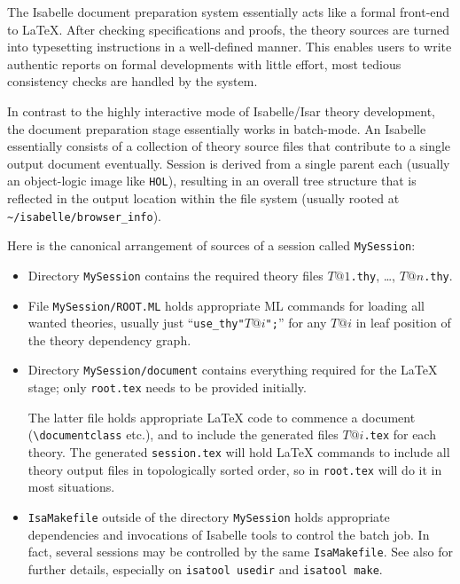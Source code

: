 \begin{isabellebody}
\begin{isamarkuptext}
  \medskip The Isabelle document preparation system essentially acts
  like a formal front-end to {\LaTeX}.  After checking specifications
  and proofs, the theory sources are turned into typesetting
  instructions in a well-defined manner.  This enables users to write
  authentic reports on formal developments with little effort, most
  tedious consistency checks are handled by the system.%
\end{isamarkuptext}%
\isamarkuptrue%
%
\isamarkuptrue%
%
\begin{isamarkuptext}%
In contrast to the highly interactive mode of Isabelle/Isar theory
  development, the document preparation stage essentially works in
  batch-mode.  An Isabelle  essentially consists of a
  collection of theory source files that contribute to a single output
  document eventually.  Session is derived from a single parent each
  (usually an object-logic image like \texttt{HOL}), resulting in an
  overall tree structure that is reflected in the output location
  within the file system (usually rooted at
  \verb,~/isabelle/browser_info,).

  Here is the canonical arrangement of sources of a session called
  \texttt{MySession}:

  \begin{itemize}

  \item Directory \texttt{MySession} contains the required theory
  files $T@1$\texttt{.thy}, \dots, $T@n$\texttt{.thy}.

  \item File \texttt{MySession/ROOT.ML} holds appropriate ML commands
  for loading all wanted theories, usually just
  ``\texttt{use_thy"$T@i$";}'' for any $T@i$ in leaf position of the
  theory dependency graph.

  \item Directory \texttt{MySession/document} contains everything
  required for the {\LaTeX} stage; only \texttt{root.tex} needs to be
  provided initially.

  The latter file holds appropriate {\LaTeX} code to commence a
  document (\verb,\documentclass, etc.), and to include the generated
  files $T@i$\texttt{.tex} for each theory.  The generated
  \texttt{session.tex} will hold {\LaTeX} commands to include all
  theory output files in topologically sorted order, so
  \verb,, in \texttt{root.tex} will do it in most
  situations.

  \item \texttt{IsaMakefile} outside of the directory
  \texttt{MySession} holds appropriate dependencies and invocations of
  Isabelle tools to control the batch job.  In fact, several sessions
  may be controlled by the same \texttt{IsaMakefile}.  See also
  \cite{isabelle-sys} for further details, especially on
  \texttt{isatool usedir} and \texttt{isatool make}.


\end{itemize}
\end{isamarkuptext}
\end{isabellebody}
